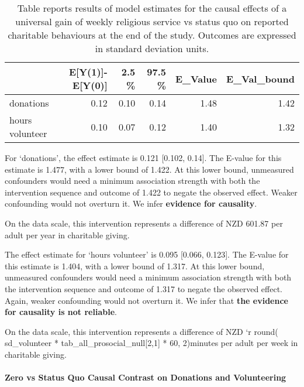 \documentclass[
  single column]{article}
\let\oldparagraph\paragraph
\renewcommand{\paragraph}[1]{\oldparagraph{#1}\mbox{}}
\begin{document}
\begin{longtable}[]{@{}lrrrrr@{}}

\caption{\label{tbl-1_2}Table reports results of model estimates for the
causal effects of a universal gain of weekly religious service vs status
quo on reported charitable behaviours at the end of the study. Outcomes
are expressed in standard deviation units.}

\tabularnewline

\toprule\noalign{}
& E{[}Y(1){]}-E{[}Y(0){]} & 2.5 \% & 97.5 \% & E\_Value &
E\_Val\_bound \\
\midrule\noalign{}
\endhead
\bottomrule\noalign{}
\endlastfoot
donations & 0.12 & 0.10 & 0.14 & 1.48 & 1.42 \\
hours volunteer & 0.10 & 0.07 & 0.12 & 1.40 & 1.32 \\

\end{longtable}

For `donations', the effect estimate is 0.121 {[}0.102, 0.14{]}. The
E-value for this estimate is 1.477, with a lower bound of 1.422. At this
lower bound, unmeasured confounders would need a minimum association
strength with both the intervention sequence and outcome of 1.422 to
negate the observed effect. Weaker confounding would not overturn it. We
infer \textbf{evidence for causality}.

On the data scale, this intervention represents a difference of NZD
601.87 per adult per year in charitable giving.

The effect estimate for `hours volunteer' is 0.095 {[}0.066, 0.123{]}.
The E-value for this estimate is 1.404, with a lower bound of 1.317. At
this lower bound, unmeasured confounders would need a minimum
association strength with both the intervention sequence and outcome of
1.317 to negate the observed effect. Again, weaker confounding would not
overturn it. We infer that \textbf{the evidence for causality is not
reliable}.

On the data scale, this intervention represents a difference of NZD `r
round( sd\_volunteer * tab\_all\_prosocial\_null{[}2,1{]} * 60,
2)minutes per adult per week in charitable giving.

\newpage{}

\paragraph{Zero vs Status Quo Causal Contrast on Donations and
Volunteering}\label{zero-vs-status-quo-causal-contrast-on-donations-and-volunteering}
\end{document}
